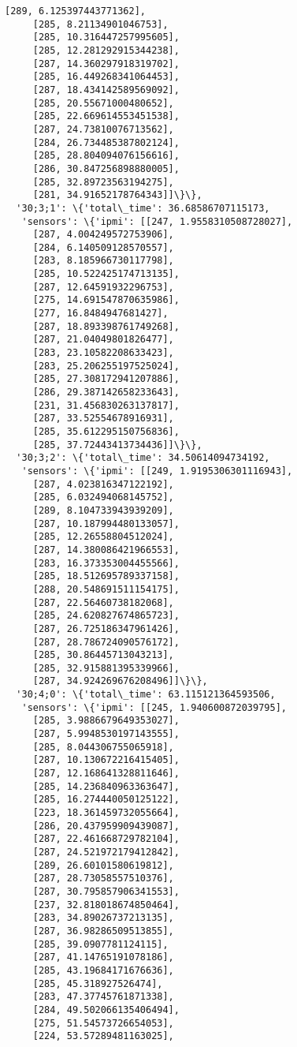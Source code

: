 \documentclass[11pt]{article}
\begin{document}
\begin{tcolorbox}[breakable, size=fbox, boxrule=.5pt, pad at break*=1mm, opacityfill=0]
\begin{Verbatim}[commandchars=\\\{\}]
     [289, 6.125397443771362],
     [285, 8.21134901046753],
     [285, 10.316447257995605],
     [285, 12.281292915344238],
     [287, 14.360297918319702],
     [285, 16.449268341064453],
     [287, 18.434142589569092],
     [285, 20.55671000480652],
     [285, 22.669614553451538],
     [287, 24.73810076713562],
     [284, 26.734485387802124],
     [285, 28.804094076156616],
     [286, 30.847256898880005],
     [285, 32.89723563194275],
     [281, 34.91652178764343]]\}\},
  '30;3;1': \{'total\_time': 36.68586707115173,
   'sensors': \{'ipmi': [[247, 1.9558310508728027],
     [287, 4.004249572753906],
     [284, 6.140509128570557],
     [283, 8.185966730117798],
     [285, 10.522425174713135],
     [287, 12.64591932296753],
     [275, 14.691547870635986],
     [277, 16.8484947681427],
     [287, 18.893398761749268],
     [287, 21.04049801826477],
     [283, 23.10582208633423],
     [283, 25.206255197525024],
     [285, 27.308172941207886],
     [286, 29.387142658233643],
     [231, 31.456830263137817],
     [287, 33.52554678916931],
     [285, 35.612295150756836],
     [285, 37.72443413734436]]\}\},
  '30;3;2': \{'total\_time': 34.50614094734192,
   'sensors': \{'ipmi': [[249, 1.9195306301116943],
     [287, 4.023816347122192],
     [285, 6.032494068145752],
     [289, 8.104733943939209],
     [287, 10.187994480133057],
     [285, 12.26558804512024],
     [287, 14.380086421966553],
     [283, 16.373353004455566],
     [285, 18.512695789337158],
     [288, 20.548691511154175],
     [287, 22.56460738182068],
     [285, 24.620827674865723],
     [287, 26.725186347961426],
     [287, 28.786724090576172],
     [285, 30.86445713043213],
     [285, 32.915881395339966],
     [287, 34.924269676208496]]\}\},
  '30;4;0': \{'total\_time': 63.115121364593506,
   'sensors': \{'ipmi': [[245, 1.940600872039795],
     [285, 3.9886679649353027],
     [287, 5.9948530197143555],
     [285, 8.044306755065918],
     [287, 10.130672216415405],
     [287, 12.168641328811646],
     [285, 14.236840963363647],
     [285, 16.274440050125122],
     [223, 18.361459732055664],
     [286, 20.437959909439087],
     [287, 22.461668729782104],
     [287, 24.521972179412842],
     [289, 26.60101580619812],
     [287, 28.73058557510376],
     [287, 30.795857906341553],
     [237, 32.818018674850464],
     [283, 34.89026737213135],
     [287, 36.98286509513855],
     [285, 39.0907781124115],
     [287, 41.14765191078186],
     [285, 43.19684171676636],
     [285, 45.318927526474],
     [283, 47.37745761871338],
     [284, 49.502066135406494],
     [275, 51.54573726654053],
     [224, 53.57289481163025],

\end{Verbatim}
\end{tcolorbox}
\end{document}

